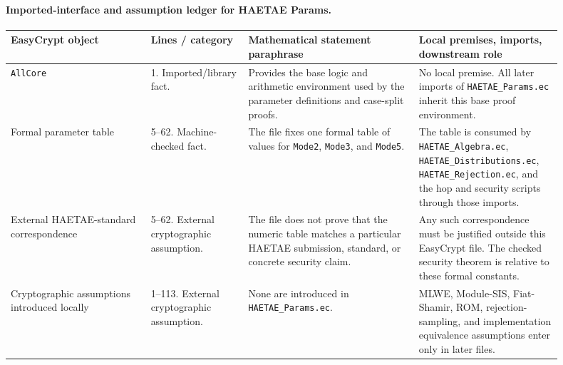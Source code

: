 \documentclass[11pt]{report}
\DeclareRobustCommand{\file}[1]{\ifmmode\text{\nolinkurl{#1}}\else\nolinkurl{#1}\fi}
\DeclareRobustCommand{\ec}[1]{\ifmmode\text{\nolinkurl{#1}}\else\nolinkurl{#1}\fi}
\theoremstyle{definition}
\theoremstyle{plain}
\begin{document}
\paragraph{Imported-interface and assumption ledger for HAETAE Params.}
{\footnotesize
\begin{longtable}{p{0.23\linewidth}p{0.16\linewidth}p{0.28\linewidth}p{0.23\linewidth}}
\toprule
\textbf{EasyCrypt object} & \textbf{Lines / category} &
\textbf{Mathematical statement paraphrase} &
\textbf{Local premises, imports, downstream role} \\
\midrule
\ec{AllCore} &
1. Imported/library fact. &
Provides the base logic and arithmetic environment used by the parameter
definitions and case-split proofs. &
No local premise.  All later imports of \file{HAETAE\_Params.ec} inherit this
base proof environment. \\
\midrule
Formal parameter table &
5--62. Machine-checked fact. &
The file fixes one formal table of values for \ec{Mode2}, \ec{Mode3}, and
\ec{Mode5}. &
The table is consumed by \file{HAETAE\_Algebra.ec},
\file{HAETAE\_Distributions.ec}, \file{HAETAE\_Rejection.ec}, and the hop and
security scripts through those imports. \\
\midrule
External HAETAE-standard correspondence &
5--62. External cryptographic assumption. &
The file does not prove that the numeric table matches a particular HAETAE
submission, standard, or concrete security claim. &
Any such correspondence must be justified outside this EasyCrypt file.  The
checked security theorem is relative to these formal constants. \\
\midrule
Cryptographic assumptions introduced locally &
1--113. External cryptographic assumption. &
None are introduced in \file{HAETAE\_Params.ec}. &
MLWE, Module-SIS, Fiat-Shamir, ROM, rejection-sampling, and implementation
equivalence assumptions enter only in later files. \\
\bottomrule
\end{longtable}
}
\end{document}
